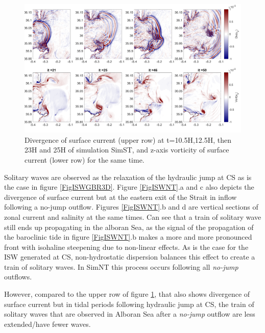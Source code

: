 \begin{figure}[!h]
 \centering
\includegraphics[width=\linewidth]{./GBR3D/FigTourbVE2.png}
 \caption {Divergence of surface current (upper row) at t=10.5H,12.5H, then 23H and 25H of simulation SimST,  and z-axis vorticity of surface current (lower row) for the same time.}
 \label{FigeddGBR3D}
\end{figure}

Solitary waves are observed as the relaxation of the hydraulic jump at CS as is the case in figure \ref{FigISWGBR3D}. Figure \ref{FigISWNT}.a and c also depicts the divergence of surface current but at the eastern exit of the Strait in inflow following a no-jump outflow. Figures \ref{FigISWNT}.b and d are vertical sections of zonal current and salinity at the same times. Can see that a train of solitary wave still ends up propagating in the alboran Sea, as the signal of the propagation of the baroclinic tide in figure \ref{FigISWNT}.b makes a more and more pronounced front with isohaline steepening due to non-linear effects. As is the case for the ISW generated at CS, non-hydrostatic dispersion balances this effect to create a train of solitary waves. In SimNT this process occurs following all \textit{no-jump} outflows.

However, compared to the upper row of figure \ref{FigeddGBR3D}, that also shows divergence of surface current but in tidal periods following hydraulic jump at CS, the train of solitary waves that are observed in Alboran Sea after a \textit{no-jump} outflow are less extended/have fewer waves. 

